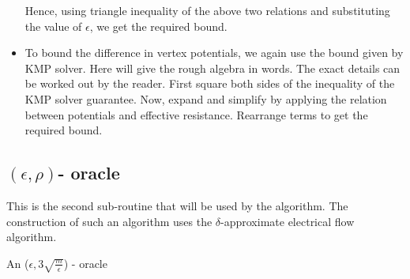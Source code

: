 \documentclass[BTech]{iitmdiss}
\begin{document}
\begin{itemize}
	    
	    Hence, using triangle inequality of the above two relations and substituting the value of $\epsilon$, we get the required bound.
	    
	    \item
		To bound the difference in vertex potentials, we again use the bound given by KMP solver. Here will give the rough algebra in words.
		The exact details can be worked out by the reader. First square both sides of the inequality of the KMP solver guarantee. Now, expand
		and simplify by applying the relation between potentials and effective resistance. Rearrange terms to get the required bound.
	    	    \end{itemize}
	  \subsection{$(\epsilon,\rho)$- oracle}
	    This is the second sub-routine that will be used by the algorithm. The construction of such an algorithm uses the $\delta$-approximate
	    electrical flow algorithm. \\
	    
	    \begin{algorithm}[H]
	     \caption{An ($\epsilon, 3 \sqrt{\frac{m}{\epsilon}}$) - oracle}
	    \end{algorithm}
   
\end{document}

